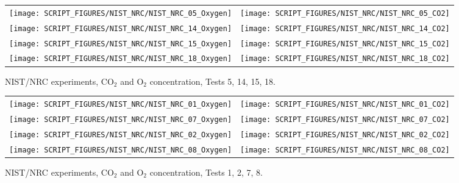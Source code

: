 \newpage

\begin{figure}[p]
\begin{tabular*}{\textwidth}{l@{\extracolsep{\fill}}r}
\texttt{[image: SCRIPT\_FIGURES/NIST\_NRC/NIST\_NRC\_05\_Oxygen]} &
\texttt{[image: SCRIPT\_FIGURES/NIST\_NRC/NIST\_NRC\_05\_CO2]} \\
\texttt{[image: SCRIPT\_FIGURES/NIST\_NRC/NIST\_NRC\_14\_Oxygen]} &
\texttt{[image: SCRIPT\_FIGURES/NIST\_NRC/NIST\_NRC\_14\_CO2]} \\
\texttt{[image: SCRIPT\_FIGURES/NIST\_NRC/NIST\_NRC\_15\_Oxygen]} &
\texttt{[image: SCRIPT\_FIGURES/NIST\_NRC/NIST\_NRC\_15\_CO2]} \\
\texttt{[image: SCRIPT\_FIGURES/NIST\_NRC/NIST\_NRC\_18\_Oxygen]} &
\texttt{[image: SCRIPT\_FIGURES/NIST\_NRC/NIST\_NRC\_18\_CO2]}
\end{tabular*}
\caption{NIST/NRC experiments, CO$_2$ and O$_2$ concentration, Tests 5, 14, 15, 18.}
\label{NIST_NRC_Gas_Open_2}
\end{figure}

\begin{figure}[p]
\begin{tabular*}{\textwidth}{l@{\extracolsep{\fill}}r}
\texttt{[image: SCRIPT\_FIGURES/NIST\_NRC/NIST\_NRC\_01\_Oxygen]} &
\texttt{[image: SCRIPT\_FIGURES/NIST\_NRC/NIST\_NRC\_01\_CO2]} \\
\texttt{[image: SCRIPT\_FIGURES/NIST\_NRC/NIST\_NRC\_07\_Oxygen]} &
\texttt{[image: SCRIPT\_FIGURES/NIST\_NRC/NIST\_NRC\_07\_CO2]} \\
\texttt{[image: SCRIPT\_FIGURES/NIST\_NRC/NIST\_NRC\_02\_Oxygen]} &
\texttt{[image: SCRIPT\_FIGURES/NIST\_NRC/NIST\_NRC\_02\_CO2]} \\
\texttt{[image: SCRIPT\_FIGURES/NIST\_NRC/NIST\_NRC\_08\_Oxygen]} &
\texttt{[image: SCRIPT\_FIGURES/NIST\_NRC/NIST\_NRC\_08\_CO2]}
\end{tabular*}
\caption{NIST/NRC experiments, CO$_2$ and O$_2$ concentration, Tests 1, 2, 7, 8.}
\label{NIST_NRC_Gas_Closed_1}
\end{figure}

